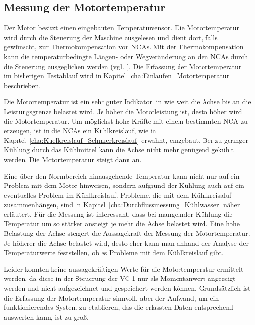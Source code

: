 \subsection{Messung der Motortemperatur}\label{cha:Messung_der_Motortemperatur}


Der Motor besitzt einen eingebauten Temperatursensor. Die Motortemperatur wird durch die Steuerung der Maschine ausgelesen und dient dort, falls gewünscht, zur Thermokompensation von NCAs. Mit der Thermokompensation kann die temperaturbedingte Längen- oder Wegveränderung an den NCAs durch die Steuerung ausgeglichen werden (vgl. \cite{OttoBihlerMaschinenfabrikGmbH&Co.KG2015}). Die Erfassung der Motortemperatur im bisherigen Testablauf wird in Kapitel~\ref{cha:Einlaufen_Motortemperatur} beschrieben.






Die Motortemperatur ist ein sehr guter Indikator, in wie weit die Achse bis an die Leistungsgrenze belastet wird. Je höher die Motorleistung ist, desto höher wird die Motortemperatur. Um möglichst hohe Kräfte mit einem bestimmten NCA zu erzeugen, ist in die NCAs ein Kühlkreislauf, wie in Kapitel~\ref{cha:Kuelkreislauf_Schmierkreislauf} erwähnt, eingebaut.  Bei zu geringer Kühlung durch das Kühlmittel kann die Achse nicht mehr genügend gekühlt werden. Die Motortemperatur steigt dann an.






Eine über den Normbereich hinausgehende Temperatur kann nicht nur auf ein Problem mit dem Motor hinweisen, sondern aufgrund der Kühlung auch auf ein eventuelles Problem im Kühlkreislauf. Probleme, die mit dem Kühlkreisaluf zusammenhängen, sind in Kapitel~\ref{cha:Durchflussmessung_Kühlwasser} näher erläutert. Für die Messung ist interessant, dass bei mangelnder Kühlung die Temperatur um so stärker ansteigt je mehr die Achse belastet wird. Eine hohe Belastung der Achse steigert die Aussagekraft der Messung der Motortemperatur. Je höherer die Achse belastet wird, desto eher kann man anhand der Analyse der Temperaturwerte feststellen, ob es Probleme mit dem Kühlkreislauf gibt.



Leider konnten keine aussagekräftigen Werte für die Motortemperatur ermittelt werden, da diese in der Steuerung der VC 1 nur als Momentanwert angezeigt werden und nicht aufgezeichnet und gespeichert werden können. Grundsätzlich ist die Erfassung der Motortemperatur sinnvoll, aber der Aufwand, um ein funktionierendes System zu etablieren, das die erfassten Daten entsprechend auswerten kann, ist zu groß. 



